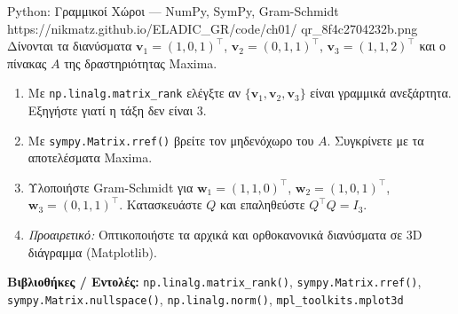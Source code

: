 \begin{pybox}{Python: Γραμμικοί Χώροι — NumPy, SymPy, Gram-Schmidt}%
             {https://nikmatz.github.io/ELADIC_GR/code/ch01/}%
             {qr_8f4c2704232b.png}
\label{py:ch1_vector_spaces}
Δίνονται τα διανύσματα $\mathbf{v}_1=(1,0,1)^\top$,
$\mathbf{v}_2=(0,1,1)^\top$, $\mathbf{v}_3=(1,1,2)^\top$
και ο πίνακας $A$ της δραστηριότητας Maxima.
\begin{enumerate}[label=(\alph*),itemsep=2pt]
  \item Με \texttt{np.linalg.matrix\_rank} ελέγξτε αν
    $\{\mathbf{v}_1,\mathbf{v}_2,\mathbf{v}_3\}$ είναι γραμμικά ανεξάρτητα.
    Εξηγήστε γιατί η τάξη δεν είναι 3.
  \item Με \texttt{sympy.Matrix.rref()} βρείτε τον μηδενόχωρο του $A$.
    Συγκρίνετε με τα αποτελέσματα Maxima.
  \item Υλοποιήστε Gram-Schmidt για $\mathbf{w}_1=(1,1,0)^\top$,
    $\mathbf{w}_2=(1,0,1)^\top$, $\mathbf{w}_3=(0,1,1)^\top$.
    Κατασκευάστε $Q$ και επαληθεύστε $Q^\top Q = I_3$.
  \item \textit{Προαιρετικό:} Οπτικοποιήστε τα αρχικά και ορθοκανονικά
    διανύσματα σε 3D διάγραμμα (Matplotlib).
\end{enumerate}
\medskip
\textbf{Βιβλιοθήκες / Εντολές:}
\texttt{np.linalg.matrix\_rank()},
\texttt{sympy.Matrix.rref()},
\texttt{sympy.Matrix.nullspace()},
\texttt{np.linalg.norm()},
\texttt{mpl\_toolkits.mplot3d}
\end{pybox}
